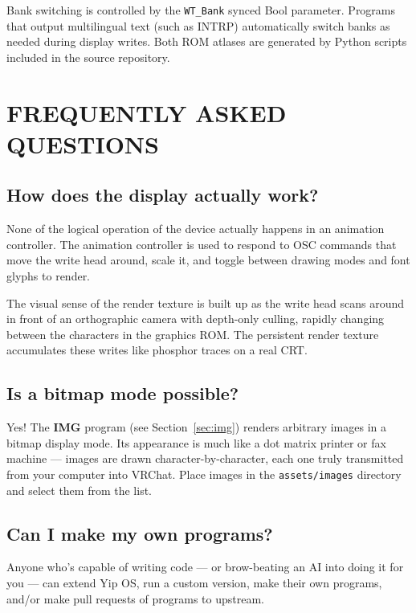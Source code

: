 \documentclass[10pt]{article}
\begin{document}
Bank switching is controlled by the \texttt{WT\_Bank} synced Bool parameter. Programs that output multilingual text (such as INTRP) automatically switch banks as needed during display writes. Both ROM atlases are generated by Python scripts included in the source repository.

\newpage
\section{FREQUENTLY ASKED QUESTIONS}
\label{sec:faq}

\subsection{How does the display actually work?}

None of the logical operation of the device actually happens in an animation controller. The animation controller is used to respond to OSC commands that move the write head around, scale it, and toggle between drawing modes and font glyphs to render.

The visual sense of the render texture is built up as the write head scans around in front of an orthographic camera with depth-only culling, rapidly changing between the characters in the graphics ROM. The persistent render texture accumulates these writes like phosphor traces on a real CRT.

\subsection{Is a bitmap mode possible?}

Yes! The \textbf{IMG} program (see Section~\ref{sec:img}) renders arbitrary images in a bitmap display mode. Its appearance is much like a dot matrix printer or fax machine --- images are drawn character-by-character, each one truly transmitted from your computer into VRChat. Place images in the \texttt{assets/images} directory and select them from the list.

\subsection{Can I make my own programs?}

Anyone who's capable of writing code --- or brow-beating an AI into doing it for you --- can extend Yip OS, run a custom version, make their own programs, and/or make pull requests of programs to upstream.
\end{document}
